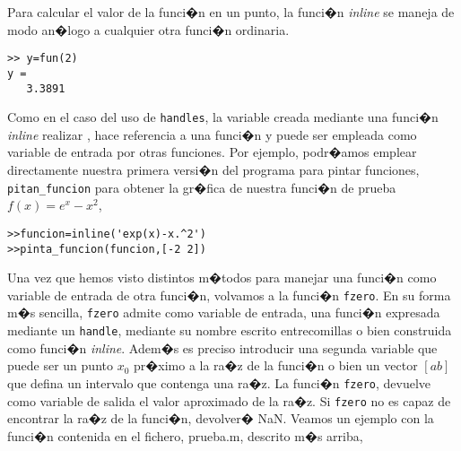 Para calcular el valor de la funci�n en un punto, la funci�n \emph{inline} se maneja de  modo an�logo a cualquier otra funci�n ordinaria.

\begin{verbatim}
>> y=fun(2)
y =
   3.3891
\end{verbatim}

Como en el caso del uso de \texttt{handles}, la variable creada mediante una funci�n \emph{inline} realizar , hace referencia a una funci�n y puede ser empleada como variable  de entrada por otras funciones. Por ejemplo, podr�amos emplear directamente nuestra primera versi�n del programa para pintar funciones, \texttt{pitan\_funcion} para obtener la gr�fica de nuestra funci�n de prueba $f(x)=e^x-x^2$,

\begin{verbatim}
>>funcion=inline('exp(x)-x.^2')
>>pinta_funcion(funcion,[-2 2])
\end{verbatim}

Una vez que hemos visto distintos m�todos para manejar una funci�n como variable de entrada de otra funci�n, volvamos a la funci�n \texttt{fzero}. En su forma m�s sencilla, \texttt{fzero} admite como variable de entrada, una funci�n expresada mediante un \texttt{handle}, mediante su nombre escrito entrecomillas o bien construida como funci�n \emph{inline}. Adem�s es preciso introducir una segunda variable que puede ser un punto $x_0$ pr�ximo a la ra�z de la funci�n o bien un vector $[a b]$ que defina un intervalo que contenga una ra�z. La funci�n \texttt{fzero}, devuelve como variable de salida el valor aproximado de la ra�z. Si \texttt{fzero} no es capaz de encontrar la ra�z de la funci�n, devolver� NaN. Veamos un ejemplo con la funci�n contenida en el fichero, prueba.m, descrito m�s arriba,

